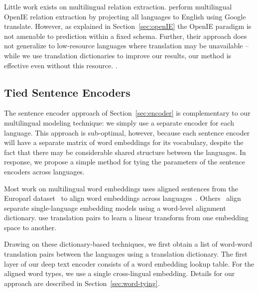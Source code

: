 Little work exists on multilingual relation extraction. \citet{faruqui2015multilingual} perform multilingual OpenIE relation extraction by projecting all languages to English using Google translate. However, as explained in Section~\ref{sec:openIE} the OpenIE paradigm is not amenable to prediction within a fixed schema. Further, their approach does not generalize to low-resource languages where translation may be unavailable -- while we use translation dictionaries to improve our results, our method is effective even without this resource. .



\subsection{Tied Sentence Encoders \label{sec:tie-words}}
The sentence encoder approach of Section~\ref{sec:encoder} is complementary to our multilingual modeling technique: we simply use a separate encoder for each language.  This approach is sub-optimal, however, because each sentence encoder will have a separate matrix of word embeddings for its vocabulary, despite the fact that there may be considerable shared structure between the languages. In response, we propose a simple method for tying the parameters of the sentence encoders across languages. 

Most work on multilingual word embeddings uses aligned sentences from the Europarl dataset~\citep{koehn2005europarl} to align word embeddings across languages~\citep{Gouws2015,luong2015bilingual,hermann2014multilingual}. Others~\citep{mikolov2013,faruqui2014retrofitting} align separate single-language embedding models using a word-level alignment dictionary. \citet{mikolov2013} use translation pairs to learn a linear transform from one embedding space to another.

Drawing on these dictionary-based techniques, we first obtain a list of word-word translation pairs between the languages using a translation dictionary. The first layer of our deep text encoder consists of a word embedding lookup table. For the aligned word types, we use a single cross-lingual embedding. Details for our approach are described in Section~\ref{sec:word-tying}.

